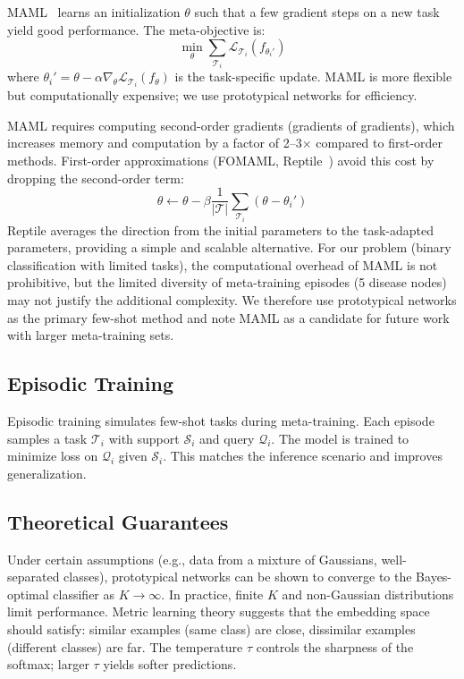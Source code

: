 MAML~\cite{finn2017model} learns an initialization $\theta$ such that a few gradient steps on a new task yield good performance. The meta-objective is:
\begin{equation}
\min_\theta \sum_{\mathcal{T}_i} \mathcal{L}_{\mathcal{T}_i}(f_{\theta_i'})
\end{equation}
where $\theta_i' = \theta - \alpha \nabla_\theta \mathcal{L}_{\mathcal{T}_i}(f_\theta)$ is the task-specific update. MAML is more flexible but computationally expensive; we use prototypical networks for efficiency.

MAML requires computing second-order gradients (gradients of gradients), which increases memory and computation by a factor of 2--3$\times$ compared to first-order methods. First-order approximations (FOMAML, Reptile~\cite{nichol2018reptile}) avoid this cost by dropping the second-order term:
\begin{equation}
\theta \gets \theta - \beta \frac{1}{|\mathcal{T}|} \sum_{\mathcal{T}_i} (\theta - \theta_i')
\end{equation}
Reptile averages the direction from the initial parameters to the task-adapted parameters, providing a simple and scalable alternative. For our problem (binary classification with limited tasks), the computational overhead of MAML is not prohibitive, but the limited diversity of meta-training episodes (5 disease nodes) may not justify the additional complexity. We therefore use prototypical networks as the primary few-shot method and note MAML as a candidate for future work with larger meta-training sets.

\subsection{Episodic Training}

Episodic training simulates few-shot tasks during meta-training. Each episode samples a task $\mathcal{T}_i$ with support $\mathcal{S}_i$ and query $\mathcal{Q}_i$. The model is trained to minimize loss on $\mathcal{Q}_i$ given $\mathcal{S}_i$. This matches the inference scenario and improves generalization.

\subsection{Theoretical Guarantees}

Under certain assumptions (e.g., data from a mixture of Gaussians, well-separated classes), prototypical networks can be shown to converge to the Bayes-optimal classifier as $K \to \infty$. In practice, finite $K$ and non-Gaussian distributions limit performance. Metric learning theory suggests that the embedding space should satisfy: similar examples (same class) are close, dissimilar examples (different classes) are far. The temperature $\tau$ controls the sharpness of the softmax; larger $\tau$ yields softer predictions.

